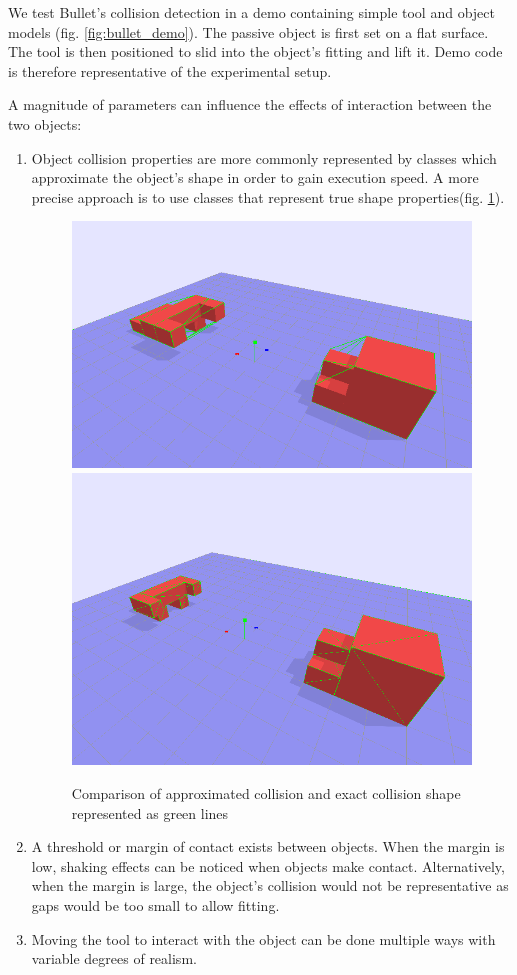 \documentclass[11]{article}
\begin{document}
We test Bullet's collision detection in a demo containing simple tool and object models (fig. \ref{fig:bullet_demo}).
The passive object is first set on a flat surface.
The tool is then positioned to slid into the object's fitting and lift it.
Demo code is therefore representative of the experimental setup.  

A magnitude of parameters can influence the effects of interaction between the two objects:
\begin{enumerate}
\item Object collision properties are more commonly represented by classes which approximate the object's shape in order to gain execution speed.
A more precise approach is to use classes that represent true shape properties(fig. \ref{fig:collision_shape}).   

\begin{figure}[h]
\centering
\includegraphics[width=.48\textwidth]{figures/collision_approximation.png}
\includegraphics[width=.41\textwidth]{figures/collision_exact.png}
\caption{Comparison of approximated collision and exact collision shape represented as green lines}
\label{fig:collision_shape}
\end{figure}      

\item A threshold or margin of contact exists between objects. 
When the margin is low, shaking effects can be noticed when objects make contact. 
Alternatively, when the margin is large, the object's collision would not be representative as gaps would be too small to allow fitting. 

\item Moving the tool to interact with the object can be done multiple ways with variable degrees of realism.
\end{enumerate}
\end{document}
